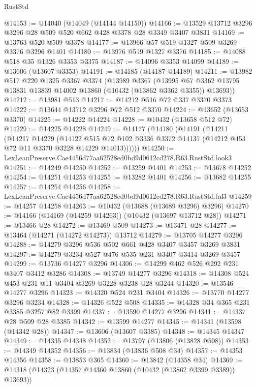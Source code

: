 \begin{lexlean}{RustStd}
\begin{coremodule}
@14153 := @14040 (@14049 (@14144 @14150))
@14166 := @13529 @13712 @3296 @3296 @28 @509 @520 @662 @428 @3378 @28 @3349 @3407 @3831
@14169 := @13763 @520 @509 @3378
@14177 := @13966 @57 @519 @1327 @509 @3269 @3376 @3296 @1401
@14180 := @13976 @519 @1327 @3376
@14185 := @14088 @518 @35 @1326 @3353 @3375
@14187 := @14096 @3353 @14099
@14189 := @13606 (@13607 @3353)
@14191 := @14185 (@14187 @14189)
@14211 := @13982
    @517
    @220
    @1325
    @3367
    @3374
    (@13989
      @3367
      (@13995 @67 @3362 @13795 @13831 @13839 @14002 @13860 (@10432 (@13862 @3362 @3355)) @13693))
@14212 := @13981 @513
@14217 := @14212 @516 @72 @337 @3370 @3373
@14222 := @13644 @13712 @3296 @72 @512 @3370
@14224 := @13652 (@13653 @3370)
@14225 := @14222 @14224
@14228 := @10432 (@13658 @512 @72)
@14229 := @14225 @14228
@14249 := @14177
    (@14180
      (@14191
        (@14211
          (@14217
            @14229
            (@14122
              @515
              @72
              @102
              @3336
              @3372
              @14137
              (@14212 @453 @72 @11 @3370 @3228 @14229 @14013))))))
@14250 := LexLeanPreserve.Cae4456d77aa62528ed0bd9d0612cd278.R63.RustStd.look3
@14251 := @14249 @14250
@14252 := @13259 @1401
@14253 := @13678 @14252
@14254 := @14251 @14253
@14255 := @13282 @1401
@14256 := @13682 @14255
@14257 := @14254 @14256
@14258 := LexLeanPreserve.Cae4456d77aa62528ed0bd9d0612cd278.R63.RustStd.fal3
@14259 := @14257 @14258
@14263 := @10432 (@13688 (@13689 @3296) @3296)
@14270 := @14166 (@14169 (@14259 @14263)) (@10432 (@13697 @13712 @28))
@14271 := @13466 @28
@14272 := @13469 @509
@14273 := @13471 @28
@14277 := @13464 (@14271 (@14272 @14273)) @13712
@14279 := @13705 @14277 @3296
@14288 := @14279 @3296 @536 @502 @661 @428 @3407 @3457 @3269 @3831
@14297 := @14279 @3234 @527 @476 @535 @231 @3407 @3414 @3269 @3457
@14299 := @13736 @14277 @3296
@14306 := @14299 @462 @526 @292 @231 @3407 @3412 @3286
@14308 := @13749 @14277 @3296
@14318 := @14308 @524 @453 @231 @11 @3404 @3269 @3228 @3238 @28 @3244
@14320 := @13546 @14277 @3296
@14323 := @14320 @524 @231 @3404
@14326 := @13770 @14277 @3296 @3234
@14328 := @14326 @522 @508
@14335 := @14328 @34 @365 @231 @3385 @3257 @82 @3399
@14337 := @13590 @14277 @3296
@14341 := @14337 @28 @509 @28 @3385
@14342 := @13599 @14277
@14345 := @14341 (@13598 (@14342 @28))
@14347 := @13606 (@13607 @3385)
@14348 := @14345 @14347
@14349 := @14335 @14348
@14352 := @13797 (@13806 (@13828 @508))
@14353 := @14349 @14352
@14356 := @13834 (@13836 @508 @34)
@14357 := @14353 @14356
@14358 := @13853 @365
@14360 := @13842 (@14358 @34)
@14369 := @14318 (@14323 (@14357 @14360 @13860 (@10432 (@13862 @3399 @3389)) @13693))

\end{coremodule}
\end{lexlean}
